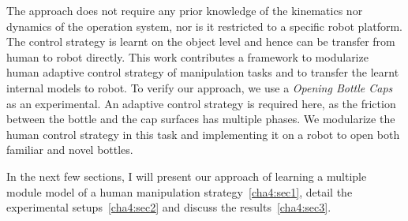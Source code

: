 The approach does not require any prior knowledge of the kinematics nor dynamics of the operation system, nor is it restricted to a specific robot platform. The control strategy is learnt on the object level and hence can be transfer from human to robot directly.
This work contributes a framework to modularize human adaptive control strategy of manipulation tasks and to transfer the learnt internal models to robot. To verify our approach, we use a \emph{Opening Bottle Caps} as an experimental. An adaptive control strategy is required here, as the friction between the bottle and the cap surfaces has multiple phases. We modularize the human control strategy in this task and implementing it on a robot to open both familiar and novel bottles.

In the next few sections, I will present our approach of learning a multiple module model of a human manipulation strategy~\ref{cha4:sec1}, detail the experimental setups~\ref{cha4:sec2} and discuss the results~\ref{cha4:sec3}.




